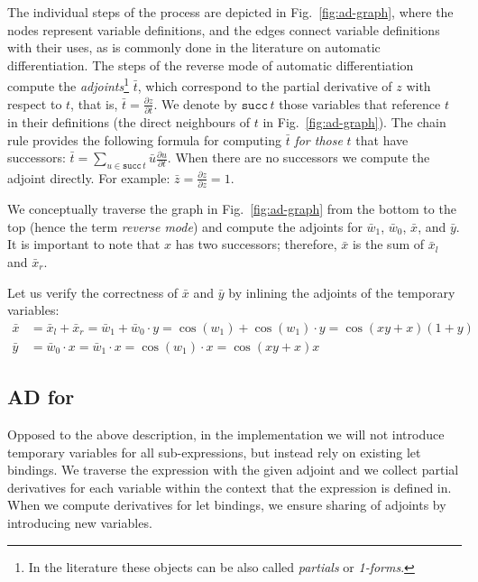 The individual steps of the process are depicted in Fig.~\ref{fig:ad-graph},
where the nodes represent variable definitions, and the edges connect variable
definitions with their uses, as is commonly done in the literature on automatic
differentiation. The steps of the reverse mode of automatic differentiation
compute the \textit{adjoints}\footnote{In the literature these objects can be
also called \emph{partials} or \emph{1-forms}.} \(\bar{t}\), which correspond to the partial
derivative of \(z\) with respect to \(t\), that is, \(\bar{t} = \frac{\partial
z}{\partial t}\). We denote by \(\mathtt{succ}\, t\) those variables that
reference \(t\) in their definitions (the direct neighbours of \(t\) in
Fig.~\ref{fig:ad-graph}). The chain rule provides the following formula for
computing \(\bar{t}\) \emph{for those} \(t\) that have successors:
\(
\bar{t} = \sum_{u \in \mathtt{succ}\, t} \bar{u} \frac{\partial u}{\partial t}.
\)
When there are no successors we compute the adjoint directly.  For example:
\(\bar{z} = \frac{\partial z}{\partial z} = 1\).

We conceptually traverse the graph in Fig.~\ref{fig:ad-graph} from the bottom
to the top (hence the term \emph{reverse mode}) and compute the
adjoints for \(\bar{w}_1\), \(\bar{w}_0\), \(\bar{x}\), and \(\bar{y}\). 
It is important to note that \(x\) has two
successors; therefore, \(\bar{x}\) is the sum of \(\bar{x}_l\) and
\(\bar{x}_r\).

Let us verify the correctness of \(\bar{x}\) and \(\bar{y}\) by inlining the
adjoints of the temporary variables:
\begin{align*}
  \bar{x} &= \bar{x}_l + \bar{x}_r = \bar{w}_1 + \bar{w}_0\cdot y 
          = \cos(w_1) + \cos(w_1)\cdot y = \cos(xy +x)(1 + y)\\
  \bar{y} &= \bar{w}_0\cdot x = \bar{w}_1 \cdot x = \cos(w_1)\cdot x = \cos(xy + x)x
\end{align*}


\subsection{AD for }

Opposed to the above description, in the implementation we will not
introduce temporary
variables for all sub-expressions, but instead rely on existing
let bindings.  We traverse the expression with the given adjoint and
we collect partial derivatives for each variable within the context that
the expression is defined in.  When we compute derivatives for let
bindings, we ensure sharing of adjoints by introducing
new variables.
 
